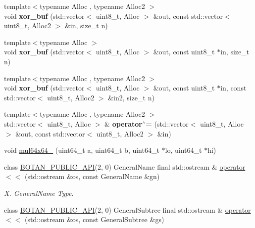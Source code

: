 \begin{DoxyCompactItemize}
{\footnotesize template$<$typename Alloc , typename Alloc2 $>$ }\\void {\bfseries xor\+\_\+buf} (std\+::vector$<$ uint8\+\_\+t, Alloc $>$ \&out, const std\+::vector$<$ uint8\+\_\+t, Alloc2 $>$ \&in, size\+\_\+t n)
\item 
\mbox{\label{namespace_botan_a18642b9fd664c941c69a454f3cfab55d}} 
{\footnotesize template$<$typename Alloc $>$ }\\void {\bfseries xor\+\_\+buf} (std\+::vector$<$ uint8\+\_\+t, Alloc $>$ \&out, const uint8\+\_\+t $\ast$in, size\+\_\+t n)
\item 
\mbox{\label{namespace_botan_a4bd935f4fd84f069c075d98ca62c02df}} 
{\footnotesize template$<$typename Alloc , typename Alloc2 $>$ }\\void {\bfseries xor\+\_\+buf} (std\+::vector$<$ uint8\+\_\+t, Alloc $>$ \&out, const uint8\+\_\+t $\ast$in, const std\+::vector$<$ uint8\+\_\+t, Alloc2 $>$ \&in2, size\+\_\+t n)
\item 
\mbox{\label{namespace_botan_afe264cb81bc30a2cd69ee3db85bf8abc}} 
{\footnotesize template$<$typename Alloc , typename Alloc2 $>$ }\\std\+::vector$<$ uint8\+\_\+t, Alloc $>$ \& {\bfseries operator$^\wedge$=} (std\+::vector$<$ uint8\+\_\+t, Alloc $>$ \&out, const std\+::vector$<$ uint8\+\_\+t, Alloc2 $>$ \&in)
\item 
void \hyperlink{namespace_botan_ad0da4682632518b5b7b11848dc3025e3}{mul64x64\+\_} (uint64\+\_\+t a, uint64\+\_\+t b, uint64\+\_\+t $\ast$lo, uint64\+\_\+t $\ast$hi)
\item 
class \hyperlink{namespace_botan_a6b9388030d872e586a4655b776ac9501}{B\+O\+T\+A\+N\+\_\+\+P\+U\+B\+L\+I\+C\+\_\+\+A\+PI}(2, 0) General\+Name final std\+::ostream \& \hyperlink{namespace_botan_a531e8b424a3517716470e1e2f6989907}{operator$<$$<$} (std\+::ostream \&os, const General\+Name \&gn)
\begin{DoxyCompactList}\small\item\em X. General\+Name Type. \end{DoxyCompactList}\item 
class \hyperlink{namespace_botan_a6b9388030d872e586a4655b776ac9501}{B\+O\+T\+A\+N\+\_\+\+P\+U\+B\+L\+I\+C\+\_\+\+A\+PI}(2, 0) General\+Subtree final std\+::ostream \& \hyperlink{namespace_botan_a4a574838c76faf9906e9c8bf369f52f6}{operator$<$$<$} (std\+::ostream \&os, const General\+Subtree \&gs)

\end{DoxyCompactItemize}
